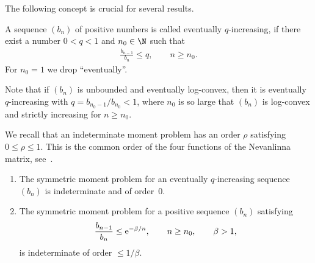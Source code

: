 The following concept is crucial for several results.

\begin{defn}\label{thm:defqinc} A sequence $(b_n)$ of positive numbers is called eventually $q$-increasing, if there exist a number $0<q<1$ and $n_0\in\N$ such that
\begin{gather}\label{eq:qinc}
\frac{b_{n-1}}{b_n}\le q,\qquad n\ge n_0.
\end{gather}
For $n_0=1$ we drop ``eventually''.
\end{defn}

Note that if $(b_n)$ is unbounded and eventually log-convex, then it is eventually $q$-increasing with $q=b_{n_0-1}/b_{n_0}<1$, where $n_0$ is so large that $(b_n)$ is log-convex and strictly increasing for $n \ge n_0$.

We recall that an indeterminate moment problem has an order $\rho$ satisfying $0 \le\rho\le 1$. This is the common order of the four functions of the Nevanlinna matrix, see~\cite{B:P}.

\begin{prop}\label{thm:qinc-indet}\quad
\begin{enumerate}\itemsep=0pt
\item[$(i)$] The symmetric moment problem for an eventually $q$-increasing sequence $(b_n)$ is indeterminate and of order~$0$.

\item[$(ii)$] The symmetric moment problem for a positive sequence $(b_n)$ satisfying
\begin{gather}\label{eq:betan}
\frac{b_{n-1}}{b_n}\le {\rm e}^{-\beta/n},\qquad n\ge n_0, \qquad \beta>1,
\end{gather}
is indeterminate of order $\le 1/\beta$.
\end{enumerate}
\end{prop}

